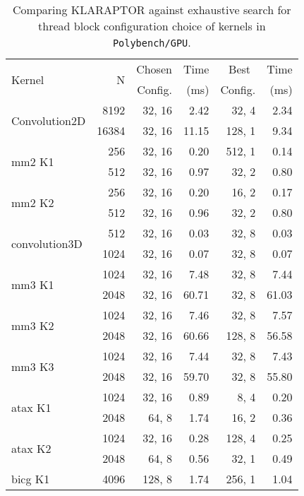 \begin{table}[htb]
\centering
\scriptsize
\caption{Comparing KLARAPTOR against exhaustive search for thread block configuration choice of kernels in \texttt{Polybench/GPU}.}\label{table:polybenchConfigCompare}
\begin{tabular}{|l|r||r|r||r|r|}
\hline
\multirow{2}{*}{Kernel} & \multirow{2}{*}{N} & Chosen & {Time} & Best$\ \ $ & {Time} \\
	& & Config. & (ms) & Config. &  (ms) \\
\hline
\multirow{2}{*}{{\scriptsize Convolution2D}} & 8192 & 32, 16 &   2.42 & 32, 4 &   2.34 \\
 & 16384 & 32, 16 &  11.15 & 128, 1 &   9.34 \\
\hline
\multirow{2}{*}{{\scriptsize mm2 K1}} & 256 & 32, 16 &   0.20 & 512, 1 &   0.14 \\
 & 512 & 32, 16 &   0.97 & 32, 2 &   0.80 \\
\hline
\multirow{2}{*}{{\scriptsize mm2 K2}} & 256 & 32, 16 &   0.20 & 16, 2 &   0.17 \\
 & 512 & 32, 16 &   0.96 & 32, 2 &   0.80 \\
\hline
\multirow{2}{*}{{\scriptsize convolution3D}} & 512 & 32, 16 &   0.03 & 32, 8 &   0.03 \\
 & 1024 & 32, 16 &   0.07 & 32, 8 &   0.07 \\
\hline
\multirow{2}{*}{{\scriptsize mm3 K1}} & 1024 & 32, 16 &   7.48 & 32, 8 &   7.44 \\
 & 2048 & 32, 16 &  60.71 & 32, 8 &  61.03 \\
\hline
\multirow{2}{*}{{\scriptsize mm3 K2}} & 1024 & 32, 16 &   7.46 & 32, 8 &   7.57 \\
 & 2048 & 32, 16 &  60.66 & 128, 8 &  56.58 \\
\hline
\multirow{2}{*}{{\scriptsize mm3 K3}} & 1024 & 32, 16 &   7.44 & 32, 8 &   7.43 \\
 & 2048 & 32, 16 &  59.70 & 32, 8 &  55.80 \\
\hline
\multirow{2}{*}{{\scriptsize atax K1}} & 1024 & 32, 16 &   0.89 & 8, 4 &   0.20 \\
 & 2048 & 64, 8 &   1.74 & 16, 2 &   0.36 \\
\hline
\multirow{2}{*}{{\scriptsize atax K2}} & 1024 & 32, 16 &   0.28 & 128, 4 &   0.25 \\
 & 2048 & 64, 8 &   0.56 & 32, 1 &   0.49 \\
\hline
\multirow{2}{*}{{\scriptsize bicg K1}} & 4096 & 128, 8 &   1.74 & 256, 1 &   1.04 \\

\end{tabular}
\end{table}
